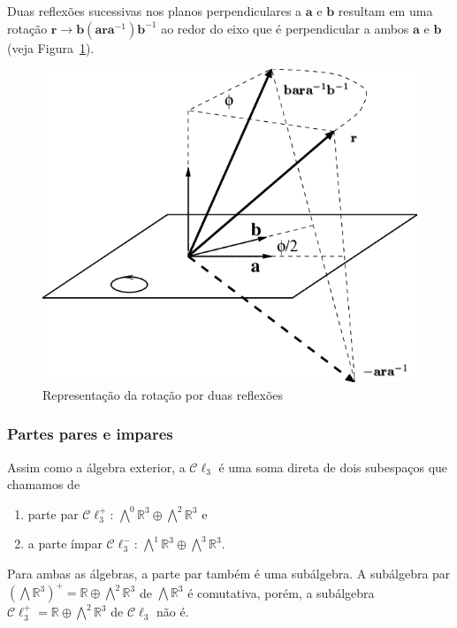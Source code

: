 \documentclass[a4paper,12pt]{report}
\theoremstyle{plain}
\theoremstyle{definition}
\begin{document}
	 Duas reflexões sucessivas nos planos perpendiculares a $\mathbf a$ e $\mathbf b$ resultam em uma rotação $\mathbf r \rightarrow \mathbf b(\mathbf a\mathbf r\mathbf a^{-1})\mathbf b^{-1}$ ao redor do eixo que é perpendicular a ambos $\mathbf a$ e $\mathbf b$ (veja Figura~\ref{fig:rotacaoCl32}).
	 
	 \begin{figure}[H]
	 	\begin{center}
	 		\includegraphics[width=0.6\linewidth]{figures/rotacaocl32.png}
	 	\end{center}
	 	\caption{Representação da rotação por duas reflexões}
	 	\label{fig:rotacaoCl32}
	 \end{figure}
	 
	\subsubsection{Partes pares e impares} 
	Assim como a álgebra exterior, a $\mathcal C \ell_3$ é uma soma direta de dois subespaços que chamamos de
	\begin{enumerate}
		\item parte par $\mathcal C \ell_3^+$: $\bigwedge^0\mathbb{R}^3 \oplus \bigwedge^2\mathbb{R}^3$ e
		\item a parte ímpar $\mathcal C \ell_3^-$: $\bigwedge^1\mathbb{R}^3\oplus \bigwedge^3\mathbb{R}^3$.
	\end{enumerate}
	Para ambas as álgebras, a parte par também é uma subálgebra. A subálgebra par $(\bigwedge\mathbb{R}^3)^+ = \mathbb{R} \oplus \bigwedge^2\mathbb{R}^3$ de $\bigwedge\mathbb{R}^3$ é comutativa, porém, a subálgebra $\mathcal C \ell_3^+ = \mathbb{R} \oplus \bigwedge^2\mathbb{R}^3$ de $\mathcal C \ell_3$ não é.
	
\end{document}
